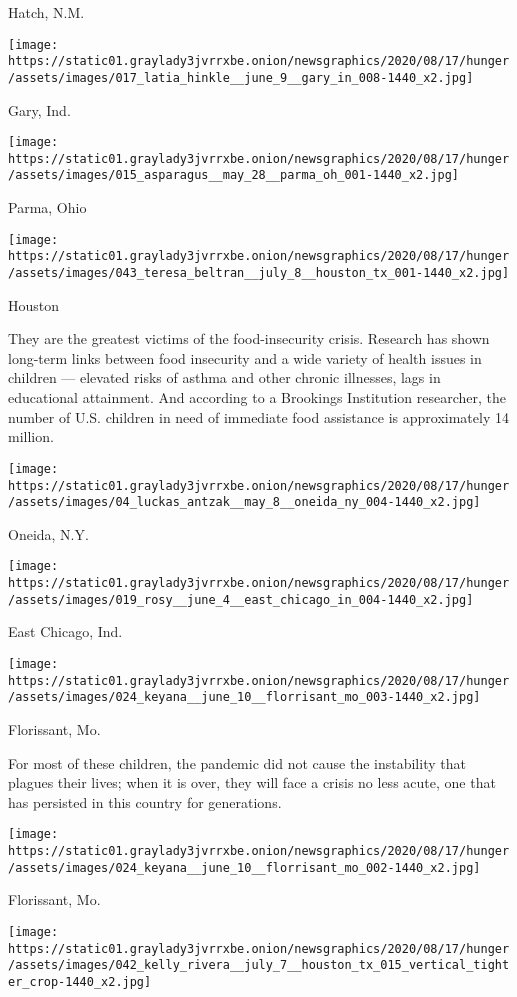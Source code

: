 Hatch, N.M.

\texttt{[image: https://static01.graylady3jvrrxbe.onion/newsgraphics/2020/08/17/hunger/assets/images/017\_latia\_hinkle\_\_june\_9\_\_gary\_in\_008-1440\_x2.jpg]}

Gary, Ind.

\texttt{[image: https://static01.graylady3jvrrxbe.onion/newsgraphics/2020/08/17/hunger/assets/images/015\_asparagus\_\_may\_28\_\_parma\_oh\_001-1440\_x2.jpg]}

Parma, Ohio

\texttt{[image: https://static01.graylady3jvrrxbe.onion/newsgraphics/2020/08/17/hunger/assets/images/043\_teresa\_beltran\_\_july\_8\_\_houston\_tx\_001-1440\_x2.jpg]}

Houston

They are the greatest victims of the food-insecurity crisis. Research
has shown long-term links between food insecurity and a wide variety of
health issues in children --- elevated risks of asthma and other chronic
illnesses, lags in educational attainment. And according to a Brookings
Institution researcher, the number of U.S. children in need of immediate
food assistance is approximately 14 million.

\texttt{[image: https://static01.graylady3jvrrxbe.onion/newsgraphics/2020/08/17/hunger/assets/images/04\_luckas\_antzak\_\_may\_8\_\_oneida\_ny\_004-1440\_x2.jpg]}

Oneida, N.Y.

\texttt{[image: https://static01.graylady3jvrrxbe.onion/newsgraphics/2020/08/17/hunger/assets/images/019\_rosy\_\_june\_4\_\_east\_chicago\_in\_004-1440\_x2.jpg]}

East Chicago, Ind.

\texttt{[image: https://static01.graylady3jvrrxbe.onion/newsgraphics/2020/08/17/hunger/assets/images/024\_keyana\_\_june\_10\_\_florrisant\_mo\_003-1440\_x2.jpg]}

Florissant, Mo.

For most of these children, the pandemic did not cause the instability
that plagues their lives; when it is over, they will face a crisis no
less acute, one that has persisted in this country for generations.

\texttt{[image: https://static01.graylady3jvrrxbe.onion/newsgraphics/2020/08/17/hunger/assets/images/024\_keyana\_\_june\_10\_\_florrisant\_mo\_002-1440\_x2.jpg]}

Florissant, Mo.

\texttt{[image: https://static01.graylady3jvrrxbe.onion/newsgraphics/2020/08/17/hunger/assets/images/042\_kelly\_rivera\_\_july\_7\_\_houston\_tx\_015\_vertical\_tighter\_crop-1440\_x2.jpg]}

